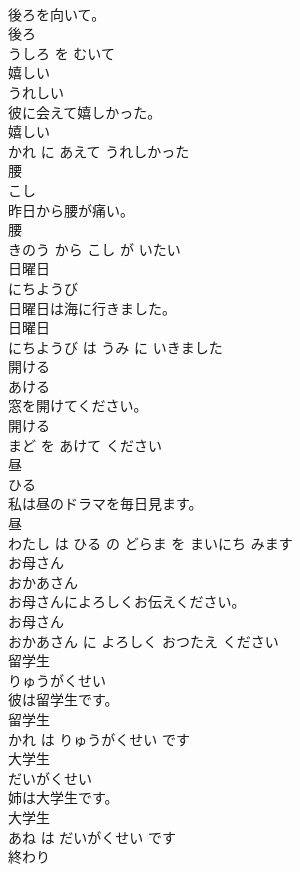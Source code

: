 \documentclass[8pt]{extreport}
\begin{document}
\begin{CJK}{UTF8}{min}
\\	後ろを向いて。	
\\	後ろ 
\\	うしろ を むいて			
\\	嬉しい	
\\	うれしい			
\\	彼に会えて嬉しかった。	
\\	嬉しい 
\\	かれ に あえて うれしかった			
\\	腰	
\\	こし			
\\	昨日から腰が痛い。	
\\	腰 
\\	きのう から こし が いたい			
\\	日曜日	
\\	にちようび			
\\	日曜日は海に行きました。	
\\	日曜日 
\\	にちようび は うみ に いきました			
\\	開ける	
\\	あける			
\\	窓を開けてください。	
\\	開ける 
\\	まど を あけて ください			
\\	昼	
\\	ひる			
\\	私は昼のドラマを毎日見ます。	
\\	昼 
\\	わたし は ひる の どらま を まいにち みます			
\\	お母さん	
\\	おかあさん			
\\	お母さんによろしくお伝えください。	
\\	お母さん 
\\	おかあさん に よろしく おつたえ ください			
\\	留学生	
\\	りゅうがくせい			
\\	彼は留学生です。	
\\	留学生 
\\	かれ は りゅうがくせい です			
\\	大学生	
\\	だいがくせい			
\\	姉は大学生です。	
\\	大学生 
\\	あね は だいがくせい です			
\\	終わり	

\end{CJK}
\end{document}

